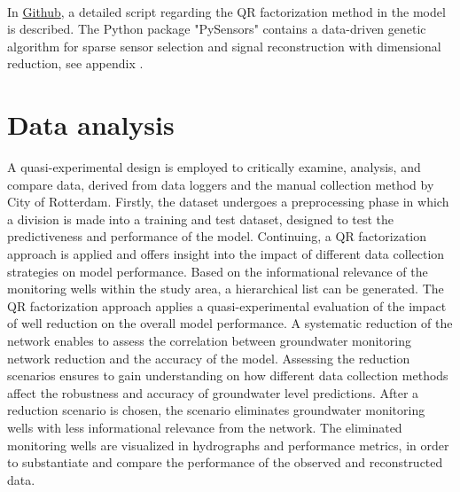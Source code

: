 \\
In \href{https://github.com/hannahwillemijn9/GWMNO-Rotterdam.git}{Github}, a detailed script regarding the QR factorization method in the model is described. The Python package "PySensors" contains a data-driven genetic algorithm for sparse sensor selection and signal reconstruction with dimensional reduction, see appendix .

\section{Data analysis}
A quasi-experimental design is employed to critically examine, analysis, and compare data, derived from data loggers and the manual collection method by City of Rotterdam. Firstly, the dataset undergoes a preprocessing phase in which a division is made into a training and test dataset, designed to test the predictiveness and performance of the model. Continuing, a QR factorization approach is applied and offers insight into the impact of different data collection strategies on model performance. Based on the informational relevance of the monitoring wells within the study area, a hierarchical list can be generated. The QR factorization approach applies a quasi-experimental evaluation of the impact of well reduction on the overall model performance. A systematic reduction of the network enables to assess the correlation between groundwater monitoring network reduction and the accuracy of the model. Assessing the reduction scenarios ensures to gain understanding on how different data collection methods affect the robustness and accuracy of groundwater level predictions. After a reduction scenario is chosen, the scenario eliminates groundwater monitoring wells with less informational relevance from the network. The eliminated monitoring wells are visualized in hydrographs and performance metrics, in order to substantiate and compare the performance of the observed and reconstructed data. 











